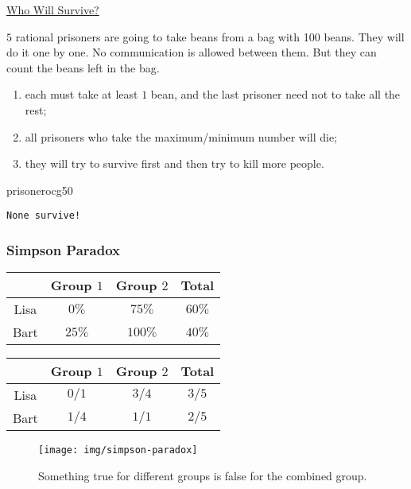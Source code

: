 \documentclass[UTF8,aspectratio=43,11pt,colorlinks,compress,openany]{beamer}%
\begin{document}
\begin{frame}[fragile]{\href{https://www.zhihu.com/question/19912025/answer/99088775}{Who Will Survive?}}
	\begin{problem}
		$5$ rational prisoners are going to take beans from a bag with 100 beans. They will do it one by one. No communication is allowed between them. But they can count the beans left in the bag.
		\begin{enumerate}
			\item each must take at least $1$ bean, and the last prisoner need not to take all the rest;
			\item all prisoners who take the maximum/minimum number will die;
			\item they will try to survive first and then try to kill more people.
		\end{enumerate}
	\end{problem}
\begin{ocg}{prisoner}{ocg5}{0}
\begin{verbatim}
None survive!
\end{verbatim}
\end{ocg}
\end{frame}

\begin{frame}\frametitle{Simpson Paradox}
\begin{center}
\begin{tabu}{c|ccc}
\hline
 & Group $1$ & Group $2$ & Total\\
\hline
Lisa & $0\%$ & $75\%$ & $60\%$\\
Bart & $25\%$ & $100\%$ & $40\%$\\
\hline
\end{tabu}\;\;
\begin{tabu}{c|ccc}
\hline
 & Group $1$ & Group $2$ & Total\\
\hline
Lisa & $0/1$ & $3/4$ & $3/5$\\
Bart & $1/4$ & $1/1$ & $2/5$\\
\hline
\end{tabu}
\end{center}
\begin{figure}
	\texttt{[image: img/simpson-paradox]}\vspace{-1ex}\caption{Something true for different groups is false for the combined group.}
\end{figure}
\end{frame}
\end{document}
